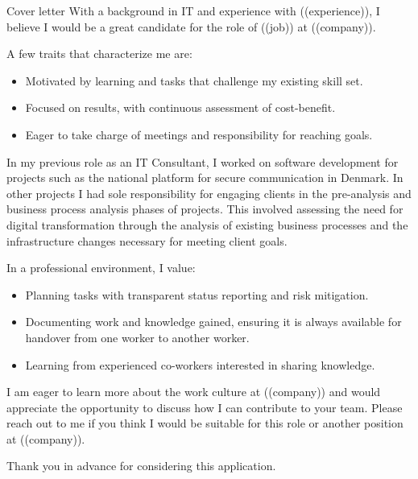 \documentclass{resume}
\begin{document}

\begin{rSection}{Cover letter}
    With a background in IT and experience with ((experience)), I believe I would be a great candidate for the role of ((job)) at ((company)).

    A few traits that characterize me are:

    \begin{itemize}
        \item Motivated by learning and tasks that challenge my existing skill set.
        \item Focused on results, with continuous assessment of cost-benefit.
        \item Eager to take charge of meetings and responsibility for reaching goals.
    \end{itemize}

    In my previous role as an IT Consultant, I worked on software development for projects such as the national platform for secure communication in Denmark. In other projects I had sole responsibility for engaging clients in the pre-analysis and business process analysis phases of projects. This involved assessing the need for digital transformation through the analysis of existing business processes and the infrastructure changes necessary for meeting client goals.

    In a professional environment, I value:

    \begin{itemize}
        \item Planning tasks with transparent status reporting and risk mitigation.
        \item Documenting work and knowledge gained, ensuring it is always available for handover from one worker to another worker.
        \item Learning from experienced co-workers interested in sharing knowledge.
    \end{itemize}

    I am eager to learn more about the work culture at ((company)) and would appreciate the opportunity to discuss how I can contribute to your team. Please reach out to me if you think I would be suitable for this role or another position at ((company)).

    Thank you in advance for considering this application.
\end{rSection}
\end{document}
